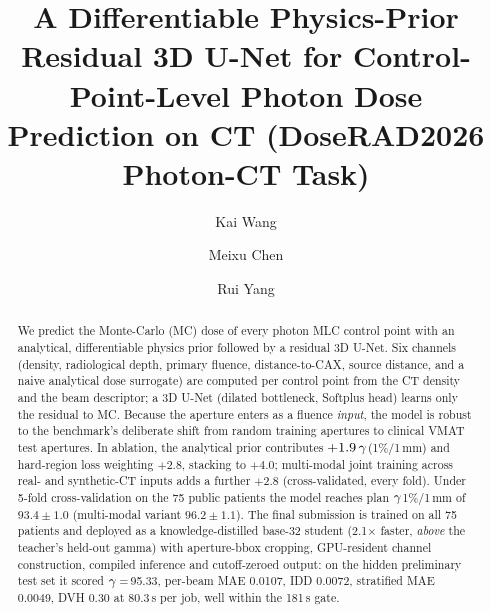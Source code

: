 \documentclass{llncs}
\begin{document}
\title{A Differentiable Physics-Prior Residual 3D U-Net for Control-Point-Level Photon Dose
Prediction on CT (DoseRAD2026 Photon-CT Task)}
\author{Kai Wang \and Meixu Chen \and Rui Yang}

\maketitle

\begin{abstract}
We predict the Monte-Carlo (MC) dose of every photon MLC control point with an analytical,
differentiable physics prior followed by a residual 3D U-Net. Six channels (density,
radiological depth, primary fluence, distance-to-CAX, source distance, and a naive analytical
dose surrogate) are computed per control point from the CT density and the beam descriptor; a
3D U-Net (dilated bottleneck, Softplus head) learns only the residual to MC. Because the aperture
enters as a fluence \emph{input}, the model is robust to the benchmark's deliberate shift from
random training apertures to clinical VMAT test apertures. In ablation, the analytical prior
contributes $+1.9\,\gamma$(1\%/1\,mm) and hard-region loss weighting $+2.8$, stacking to $+4.0$;
multi-modal joint training across real- and synthetic-CT inputs adds a further $+2.8$
(cross-validated, every fold). Under 5-fold cross-validation on the 75 public patients the model
reaches plan $\gamma$1\%/1\,mm of $93.4\pm1.0$ (multi-modal variant $96.2\pm1.1$). The final
submission is trained on all 75 patients and deployed as a knowledge-distilled base-32 student
(2.1$\times$ faster, \emph{above} the teacher's held-out gamma) with aperture-bbox cropping,
GPU-resident channel construction, compiled inference and cutoff-zeroed output: on the hidden
preliminary test set it scored $\gamma$\,=\,95.33, per-beam MAE 0.0107, IDD 0.0072, stratified MAE
0.0049, DVH 0.30 at 80.3\,s per job, well within the 181\,s gate.
\end{abstract}
\end{document}
